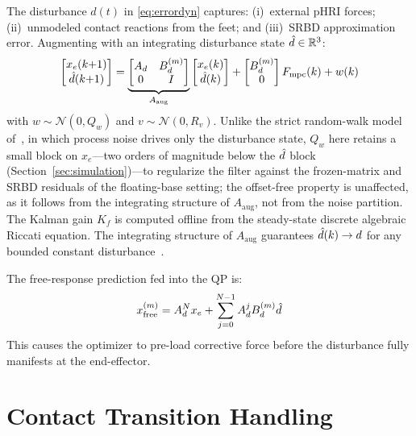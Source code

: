 The disturbance $d(t)$ in \eqref{eq:errordyn} captures: (i)~external pHRI
forces; (ii)~unmodeled contact reactions from the feet; and (iii)~SRBD
approximation error.
Augmenting with an integrating disturbance state $\hat{d}\in\mathbb{R}^3$:
\begin{equation}\label{eq:augstate}
  \begin{bmatrix}x_e(k{+}1)\\\hat{d}(k{+}1)\end{bmatrix}
  =\underbrace{\begin{bmatrix}A_d & B_d^{(m)} \\ 0 & I\end{bmatrix}}_{A_{\text{aug}}}
  \begin{bmatrix}x_e(k)\\\hat{d}(k)\end{bmatrix}
  +\begin{bmatrix}B_d^{(m)}\\0\end{bmatrix}F_{\text{mpc}}(k)+w(k)
\end{equation}
with $w\sim\mathcal{N}(0,Q_w)$ and $v\sim\mathcal{N}(0,R_v)$.
Unlike the strict random-walk model of~\cite{cao2026impedance}, in which
process noise drives only the disturbance state, $Q_w$ here retains a
small block on $x_e$---two orders of magnitude below the $\hat{d}$
block (Section~\ref{sec:simulation})---to regularize the filter against
the frozen-matrix and SRBD residuals of the floating-base setting; the
offset-free property is unaffected, as it follows from the integrating
structure of $A_{\text{aug}}$, not from the noise partition.
The Kalman gain $K_f$ is computed offline from the steady-state discrete
algebraic Riccati equation.
The integrating structure of $A_{\text{aug}}$ guarantees $\hat{d}(k)\to d$
for any bounded constant disturbance~\cite{cao2004antiwindup}.

The free-response prediction fed into the QP is:
\begin{equation}\label{eq:freeresponse}
  x_{\text{free}}^{(m)} = A_d^N x_e + \sum_{j=0}^{N-1}A_d^j B_d^{(m)}\hat{d}
\end{equation}
This causes the optimizer to pre-load corrective force before the
disturbance fully manifests at the end-effector.

\section{Contact Transition Handling}\label{sec:switching}

